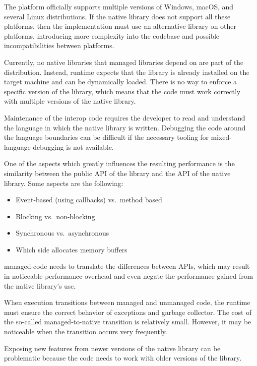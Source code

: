 \begin{itemize}

     The \dotnet{} platform officially supports
multiple versions of Windows, macOS, and several Linux distributions. If the native library does not
support all these platforms, then the implementation must use an alternative library on other
platforms, introducing more complexity into the codebase and possible incompatibilities between
platforms.

     Currently, no native libraries that managed
\dotnet{} libraries depend on are part of the \dotnet{} distribution. Instead, \dotnet{} runtime
expects that the library is already installed on the target machine and can be dynamically loaded.
There is no way to enforce a specific version of the library, which means that the \dotnet{} code
must work correctly with multiple versions of the native library.

     Maintenance of the interop code requires the developer to read and
understand the language in which the native library is written. Debugging the code around the
language boundaries can be difficult if the necessary tooling for mixed-language debugging is not
available.

     One of the aspects which greatly influences the resulting performance is
the similarity between the public API of the \dotnet{} library and the API of the native library.
Some aspects are the following:

    \begin{itemize}
      \item Event-based (using callbacks) vs.\ method based
      \item Blocking vs.\ non-blocking
      \item Synchronous vs.\ asynchronous
      \item Which side allocates memory buffers
    \end{itemize}

    \Gls{managed-code} needs to translate the differences between APIs, which may result in
noticeable performance overhead and even negate the performance gained from the native library's
use.

     When execution transitions between managed and unmanaged code,
the runtime must ensure the correct behavior of exceptions and garbage collector. The cost of the
so-called managed-to-native transition is relatively small. However, it may be noticeable when the
transition occurs very frequently.

     Exposing new features from newer versions of the native library can
be problematic because the code needs to work with older versions of the library.

\end{itemize}

